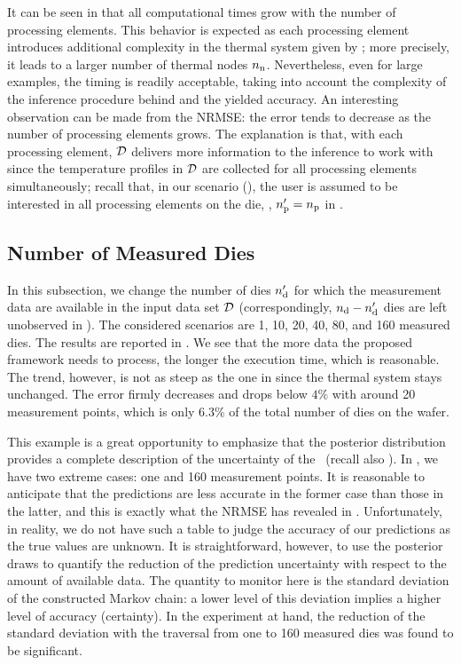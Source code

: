It can be seen in  that all computational times grow with the number of processing elements. This behavior is expected as each processing element introduces additional complexity in the thermal system given by ; more precisely, it leads to a larger number of thermal nodes ${n_\text{n}}$. Nevertheless, even for large examples, the timing is readily acceptable, taking into account the complexity of the inference procedure behind and the yielded accuracy.
An interesting observation can be made from the NRMSE: the error tends to decrease as the number of processing elements grows. The explanation is that, with each processing element, $\mathcal{D}$ delivers more information to the inference to work with since the temperature profiles in $\mathcal{D}$ are collected for all processing elements simultaneously; recall that, in our scenario (), the user is assumed to be interested in all processing elements on the die, \ie, ${n_\text{p}'} = {n_\text{p}}$ in .

\subsection{Number of Measured Dies}
In this subsection, we change the number of dies ${n_\text{d}'}$ for which the measurement data are available in the input data set $\mathcal{D}$ (correspondingly, ${n_\text{d}} - {n_\text{d}'}$ dies are left unobserved in ). The considered scenarios are 1, 10, 20, 40, 80, and 160 measured dies. The results are reported in . We see that the more data the proposed framework needs to process, the longer the execution time, which is reasonable. The trend, however, is not as steep as the one in  since the thermal system stays unchanged.
The error firmly decreases and drops below $4\%$ with around 20 measurement points, which is only $6.3\%$ of the total number of dies on the wafer.


This example is a great opportunity to emphasize that the posterior distribution provides a complete description of the uncertainty of the \qoi\ (recall also ).
In , we have two extreme cases: one and 160 measurement points. It is reasonable to anticipate that the predictions are less accurate in the former case than those in the latter, and this is exactly what the NRMSE has revealed in .
Unfortunately, in reality, we do not have such a table to judge the accuracy of our predictions as the true values are unknown.
It is straightforward, however, to use the posterior draws to quantify the reduction of the prediction uncertainty with respect to the amount of available data.
The quantity to monitor here is the standard deviation of the constructed Markov chain: a lower level of this deviation implies a higher level of accuracy (certainty). In the experiment at hand, the reduction of the standard deviation with the traversal from one to 160 measured dies was found to be significant.

